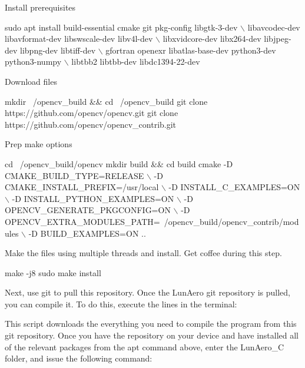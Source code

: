 \begin{DoxyItemize}
\item Install prerequisites 
\begin{DoxyCode}
sudo apt install build-essential cmake git pkg-config libgtk-3-dev \(\backslash\)
libavcodec-dev libavformat-dev libswscale-dev libv4l-dev \(\backslash\)
libxvidcore-dev libx264-dev libjpeg-dev libpng-dev libtiff-dev \(\backslash\)
gfortran openexr libatlas-base-dev python3-dev python3-numpy \(\backslash\)
libtbb2 libtbb-dev libdc1394-22-dev
\end{DoxyCode}

\item Download files 
\begin{DoxyCode}
mkdir ~/opencv\_build && cd ~/opencv\_build
git clone https://github.com/opencv/opencv.git
git clone https://github.com/opencv/opencv\_contrib.git
\end{DoxyCode}

\item Prep make options 
\begin{DoxyCode}
cd ~/opencv\_build/opencv
mkdir build && cd build
cmake -D CMAKE\_BUILD\_TYPE=RELEASE \(\backslash\)
    -D CMAKE\_INSTALL\_PREFIX=/usr/local \(\backslash\)
    -D INSTALL\_C\_EXAMPLES=ON \(\backslash\)
    -D INSTALL\_PYTHON\_EXAMPLES=ON \(\backslash\)
    -D OPENCV\_GENERATE\_PKGCONFIG=ON \(\backslash\)
    -D OPENCV\_EXTRA\_MODULES\_PATH=~/opencv\_build/opencv\_contrib/modules \(\backslash\)
    -D BUILD\_EXAMPLES=ON ..
\end{DoxyCode}

\item Make the files using multiple threads and install. Get coffee during this step. 
\begin{DoxyCode}
make -j8
sudo make install
\end{DoxyCode}

\end{DoxyItemize}

Next, use {\ttfamily git} to pull this repository. Once the Lun\+Aero {\ttfamily git} repository is pulled, you can compile it. To do this, execute the lines in the terminal\+:




This script downloads the everything you need to compile the program from this {\ttfamily git} repository. Once you have the repository on your device and have installed all of the relevant packages from the {\ttfamily apt} command above, enter the Lun\+Aero\+\_\+C folder, and issue the following command\+:


